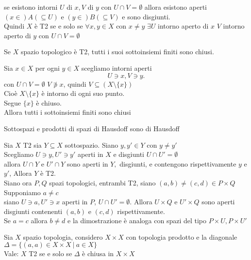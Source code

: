 \documentclass[12px]{article}
\begin{document}
se esistono intorni  $U$  di $x, V$ di  $y$ con $U\cap V = \emptyset$ allora esistono aperti  $(x\in)A(\subseteq U)$ e  $(y\in )B(\subseteq V)$ e sono disgiunti.\\
Quindi  $X$ è T2 se e solo se $\forall x,y\in X$ con $x\neq y$  $\exists U $ intorno aperto di $x$ $V$ intorno aperto di $y$ con $U\cap V = \emptyset$
 \begin{lemm}
	Se $X$ spazio topologico è T2, tutti i suoi sottoinsiemi finiti sono chiusi.
\end{lemm}
\begin{dimo}
	Sia $x\in X$ per ogni  $y\in X$ scegliamo intorni aperti 
	 \[
	U\ni x, V\ni y
	.\] 
	con $U\cap V= \emptyset$ $V\not\ni x$, quindi  $V\subseteq (X\setminus \{x\})$ \\
	Cioè $X\setminus \{x\}$ è intorno di ogni suo punto.\\
	Segue  $\{x\}$ è chiuso.\\
	Allora tutti i sottoinsiemi finiti sono chiusi
\end{dimo}
\begin{prop}
	Sottospazi e prodotti di spazi di Hausdoff sono di Hausdoff
\end{prop}
\begin{dimo}
	Sia $X$ T2 sia $Y\subseteq X$ sottospazio.
	Siano $y,y'\in Y$ con $y\neq y'$\\
	Scegliamo  $U\ni y, U'\ni y'$ aperti in  $X$ e disgiunti $U\cap U' = \emptyset$\\
	allora  $U\cap Y$ e $U'\cap Y$ sono aperti in  $Y, $ disgiunti, e contengono rispettivamente $y$ e $y'$, Allora  $Y$ è T2.\\
	Siano ora $P,Q$ spazi topologici, entrambi T2, siano  $(a,b)\neq (c,d)\in P\times Q$\\
	Supponiamo  $a\neq c$ \\
siano $U\ni a, U'\ni x$ aperti in  $P$, $U\cap U' = \emptyset$. Allora  $U\times Q$ e  $U'\times Q$ sono aperti disgiunti contenenti $(a,b)$ e $(c,d)$ rispettivamente.\\
Se $a  = c$ allora $b\neq d$  e la dimostrazione è analoga con spazi del tipo $P\times U, P\times U' $
\end{dimo}
\begin{teo}
	Sia $X$ spazio topologia, considero $X\times X$ con topologia prodotto e la diagonale  $\Delta = \{(a,a)\in X\times X \ | \ a\in X\}$\\
	Vale:  $X$ T2 se e solo se  $\Delta$ è chiusa in $X\times X$
\end{teo}
\end{document}
